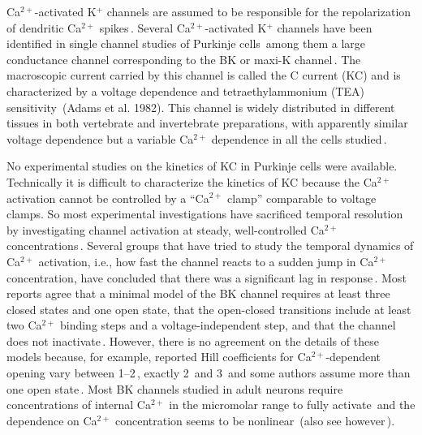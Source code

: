 \documentclass[12pt]{article}
\begin{document}
Ca$^{2+}$-activated K$^+$ channels are assumed to be responsible for the repolarization of dendritic Ca$^{2+}$ spikes\,\cite{R:1980pi}. Several Ca$^{2+}$-activated K$^+$ channels have been identified in single channel studies of Purkinje cells\,\cite{Gahwiler:1989fk, Gruol:1989oq, Gruol:1991dz} among them a large conductance channel corresponding to the BK or maxi-K channel\,\cite{Latorre:1989fu}. The macroscopic current carried by this channel is called the C current (KC) and is characterized by a voltage dependence and tetraethylammonium (TEA) sensitivity\,\cite{} (Adams et al. 1982). This channel is widely distributed in different tissues in both vertebrate and invertebrate preparations, with apparently similar voltage dependence but a variable Ca$^{2+}$ dependence in all the cells studied\,\cite{Latorre:1989fu}.

No experimental studies on the kinetics of KC in Purkinje cells were available. Technically it is difficult to characterize the kinetics of KC because the Ca$^{2+}$ activation cannot be controlled by a ``Ca$^{2+}$ clamp'' comparable to voltage clamps. So most experimental investigations have sacrificed temporal resolution by investigating channel activation at steady, well-controlled Ca$^{2+}$ concentrations\,\cite{McManus:1898kl, Moczydlowski:1983qa, Smart:1987mi}. Several groups that have tried to study the temporal dynamics of Ca$^{2+}$ activation, i.e., how fast the channel reacts to a sudden jump in Ca$^{2+}$ concentration, have concluded that there was a significant lag in response\,\cite{Gola:1990pi, Hudspeth:1988ff, Ikemoto:1989lh, L:1989ff}. Most reports agree that a minimal model of the BK channel requires at least three closed states and one open state, that the open-closed transitions include at least two Ca$^{2+}$ binding steps and a voltage-independent step, and that the channel does not inactivate\,\cite{Gola:1990pi, Moczydlowski:1983qa, Smart:1987mi}. However, there is no agreement on the details of these models because, for example, reported Hill coefficients for Ca$^{2+}$-dependent opening vary between 1--2\,\cite{Franciolini:1988fu, Moczydlowski:1983qa}, exactly 2\,\cite{Hudspeth:1988ff, Reinhart1989:xe} and 3\,\cite{Ikemoto:1989lh} and some authors assume more than one open state\,\cite{McManus:1898kl, Smart:1987mi}. Most BK channels studied in adult neurons require concentrations of internal Ca$^{2+}$ in the micromolar range to fully activate\,\cite{Franciolini:1988fu, Lancaster:1991ye, Reinhart1989:xe, Smart:1987mi} and the dependence on Ca$^{2+}$ concentration seems to be nonlinear\,\cite{Franciolini:1988fu, Moczydlowski:1983qa} (also see however\,\cite{L:1989ff}).
\end{document}
